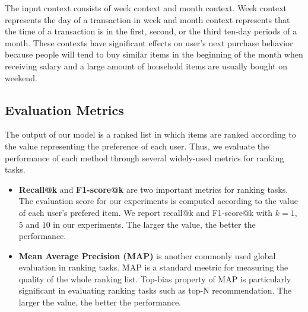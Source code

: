 \documentclass[conference]{IEEEtran}
\begin{document}
The input context consists of week context and month context. Week context represents the day of a transaction in week and month context represents that the time of a transaction is in the first, second, or the third ten-day periods of a month. These contexts have significant effects on user's next purchase behavior because people will tend to buy similar items in the beginning of the month when receiving salary and a large amount of household items are usually bought on weekend.


\subsection{Evaluation Metrics}
The output of our model is a ranked list in which items are ranked according to the value representing the preference of each user. Thus, we evaluate the performance of each method through several widely-used metrics for ranking tasks.
\begin{itemize}
\item \textbf{Recall@k} and \textbf{F1-score@k} are two important metrics for ranking tasks. The evaluation score for our experiments is computed according to the value of each user's prefered item. We report recall@k and F1-score@k with $k=1$, $5$ and $10$ in our experiments. The larger the value, the better the performance.

\item \textbf{Mean Average Precision (MAP)} is another commonly used global evaluation in ranking tasks. MAP is a standard meetric for measuring the quality of the whole ranking list. Top-bias property of MAP is particularly significant in evaluating ranking tasks such as top-N recommendation. The larger the value, the better the performance.
\end{itemize}
\end{document}
